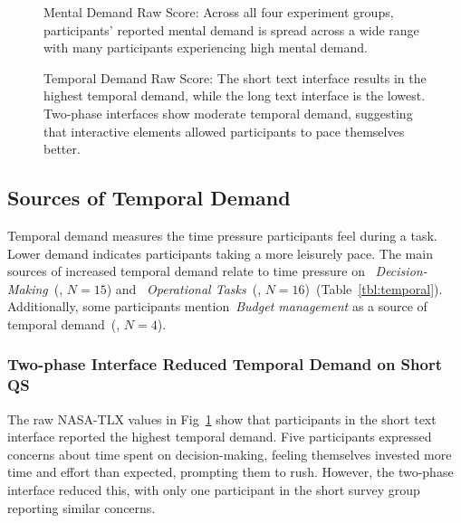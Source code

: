 \begin{figure}[t!]
{\begin{minipage}{0.48\textwidth}
            \vfill
        \end{minipage}
    } 
    \begin{minipage}[t]{0.48\textwidth}
        \caption{Mental Demand Raw Score: Across all four experiment groups, participants' reported mental demand is spread across a wide range with many participants experiencing high mental demand.}
        \label{fig:mental_cog_score}
    \end{minipage}%
    \hfill
    \begin{minipage}[t]{0.48\textwidth}
        \caption{Temporal Demand Raw Score: The short text interface results in the highest temporal demand, while the long text interface is the lowest. Two-phase interfaces show moderate temporal demand, suggesting that interactive elements allowed participants to pace themselves better.}
        \label{fig:temporal_cog_score}
    \end{minipage}
\end{figure}



\subsection{Sources of Temporal Demand} 
\label{sec:temporal}

Temporal demand measures the time pressure participants feel during a task. Lower demand indicates participants taking a more leisurely pace. The main sources of increased temporal demand relate to time pressure on ~\textit{Decision-Making}~(, $N=15$) and ~\textit{Operational Tasks}~(, $N=16$)~(Table~\ref{tbl:temporal}). Additionally, some participants mention~\textit{Budget management} as a source of temporal demand~(, $N=4$).

\subsubsection{Two-phase Interface Reduced Temporal Demand on Short QS} The raw NASA-TLX values in Fig~\ref{fig:temporal_cog_score} show that participants in the short text interface reported the highest temporal demand. Five participants expressed concerns about time spent on decision-making, feeling themselves invested more time and effort than expected, prompting them to rush. However, the two-phase interface reduced this, with only one participant in the short survey group reporting similar concerns.

